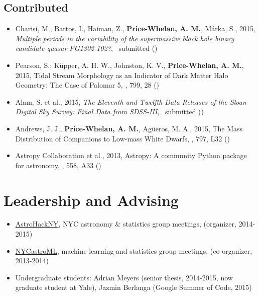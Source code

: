 \documentclass[12pt,letterpaper]{article}
\begin{document}
	\subsection*{Contributed}

	\begin{itemize}
	
\item Charisi, M., Bartos, I., Haiman, Z., {\bf Price-Whelan, A. M.}, M\'arka, S., 2015,
    \emph{Multiple periods in the variability of the supermassive black hole binary candidate quasar PG1302-102?},
    \mnras\ submitted ()

\item Pearson, S.; K\"upper, A. H. W., Johnston, K. V., {\bf Price-Whelan, A. M.}, 2015,
    {Tidal Stream Morphology as an Indicator of Dark Matter Halo Geometry: The Case of Palomar 5},
    \apj, 799, 28 ()
    
\item Alam, S. et al., 2015,
    \emph{The Eleventh and Twelfth Data Releases of the Sloan Digital Sky Survey: Final Data from SDSS-III},
    \apjs\ submitted ()
    
\item Andrews, J. J., {\bf Price-Whelan, A. M.}, Ag\"ueros, M. A., 2015,
    {The Mass Distribution of Companions to Low-mass White Dwarfs},
    \apjl, 797, L32 ()
    
\item Astropy Collaboration et al., 2013, 
    {Astropy: A community Python package for astronomy},
    \aanda, 558, A33 ()
    
	\end{itemize}

\section*{Leadership and Advising}
	\begin{itemize}
	\item \href{https://groups.google.com/forum/#!forum/astrohackny}{AstroHackNY}, NYC astronomy \& statistics group meetings, (organizer, 2014-2015)
	\item \href{https://github.com/adrn/nycastroml}{NYCastroML}, machine learning and statistics group meetings, (co-organizer, 2013-2014)
	\item Undergraduate students: Adrian Meyers (senior thesis, 2014-2015, now graduate student at Yale), Jazmin Berlanga (Google Summer of Code, 2015)
	\end{itemize}
\end{document}
